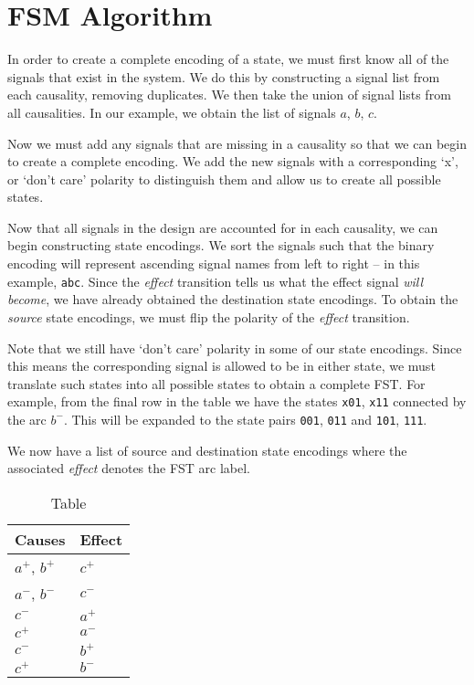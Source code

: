 \section{FSM Algorithm}\label{sec:algo}

In order to create a complete encoding of a state, we must first know all of the
signals that exist in the system.  We do this by constructing a signal list from
each causality, removing duplicates.  We then take the union of signal lists
from all causalities.  In our example, we obtain the list of signals $a$, $b$,
$c$.

Now we must add any signals that are missing in a causality so that we can begin
to create a complete encoding.  We add the new signals with a corresponding `x',
or `don't care' polarity to distinguish them and allow us to create all possible
states.

Now that all signals in the design are accounted for in each causality, we can
begin constructing state encodings.  We sort the signals such that the binary
encoding will represent ascending signal names from left to right -- in this
example, \texttt{abc}.  Since the \emph{effect} transition tells us what the
effect signal \emph{will become}, we have already obtained the destination state
encodings.  To obtain the \emph{source} state encodings, we must flip the
polarity of the \emph{effect} transition.

Note that we still have `don't care' polarity in some of our state encodings.
Since this means the corresponding signal is allowed to be in either state, we
must translate such states into all possible states to obtain a complete FST.
For example, from the final row in the table we have the states \texttt{x01},
\texttt{x11} connected by the arc $b^{-}$.  This will be expanded to the state
pairs \texttt{001}, \texttt{011} and \texttt{101}, \texttt{111}.

We now have a list of source and destination state encodings where the
associated \emph{effect} denotes the FST arc label.

\begin{table}[ht]
\caption{Table}\label{tab:table1}
\centering
\begin{tabular}{@{}ll@{}}
	\toprule
	Causes & Effect\\ \midrule
	$a^{+}$, $b^{+}$	& $c^{+}$ \\
	$a^{-}$, $b^{-}$ 	& $c^{-}$ \\
	$c^{-}$			& $a^{+}$ \\
	$c^{+}$			& $a^{-}$ \\
	$c^{-}$			& $b^{+}$ \\
	$c^{+}$			& $b^{-}$ \\
	\bottomrule
\end{tabular}
\end{table}

